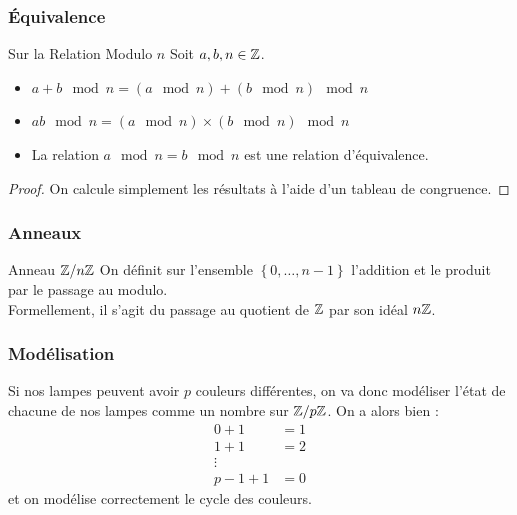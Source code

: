 \documentclass{beamercours}
\begin{document}
\begin{frame}
    \frametitle{Équivalence}
    \begin{propositionfr}{Sur la Relation Modulo $n$}{}
        Soit $a, b, n \in \mathbb{Z}$.
        \begin{itemize}
            \item $a + b \mod n = (a \mod n) + (b \mod n) \mod n$
            \item $ab \mod n = (a \mod n) \times (b \mod n) \mod n$
            \item La relation $a \mod n = b \mod n$ est une relation d'équivalence.
        \end{itemize}
    \end{propositionfr}
    \begin{proof}
        On calcule simplement les résultats à l'aide d'un tableau de congruence.
    \end{proof}

\end{frame}

\begin{frame}
\frametitle{Anneaux}
\begin{définition}{Anneau $\mathbb{Z}/n\mathbb{Z}$}{}
On définit sur l'ensemble $\left\{0, \ldots, n - 1\right\}$ l'addition et le produit par le passage au modulo. \\
Formellement, il s'agit du passage au quotient de $\mathbb{Z}$ par son idéal $n\mathbb{Z}$.
\end{définition}
\end{frame}

\begin{frame}
    \frametitle{Modélisation}
    Si nos lampes peuvent avoir $p$ couleurs différentes, on va donc modéliser l'état de chacune de nos lampes comme un nombre sur $\mathbb{Z}/p\mathbb{Z}$. On a alors bien :
    \[
        \begin{aligned}
            0 + 1   & = 1 \\
            1 + 1   & = 2 \\
            \vdots  &     \\
            p-1 + 1 & = 0
        \end{aligned}
    \]
    et on modélise correctement le cycle des couleurs.


\end{frame}
\end{document}
